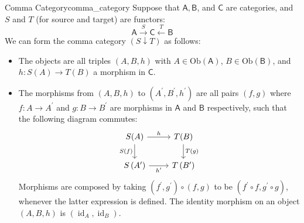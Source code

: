 \begin{definition}{Comma Category}{comma_category}
    Suppose that $\mathsf{A}, \mathsf{B}$, and $\mathsf{C}$ are categories, and $S$ and $T$ (for source and target) are functors:
$$
\mathsf{A} \stackrel{S}{\longrightarrow} \mathsf{C} \stackrel{T}{\longleftarrow} \mathsf{B}
$$
We can form the comma category $(S\downarrow T)$ as follows:
\begin{itemize}
    \item The objects are all triples $(A, B, h)$ with $A\in\mathrm{Ob}(\mathsf{A})$, $B\in\mathrm{Ob}(\mathsf{B})$, and $h: S(A) \rightarrow T(B)$ a morphism in $\mathsf{C}$.
    \item The morphisms from $(A, B, h)$ to $\left(A^{\prime}, B^{\prime}, h^{\prime}\right)$ are all pairs $(f, g)$ where $f: A \rightarrow A^{\prime}$ and $g: B \rightarrow B^{\prime}$ are morphisms in $\mathsf{A}$ and $\mathsf{B}$ respectively, such that the following diagram commutes:
    \[
        \begin{tikzcd}[ampersand replacement=\&]
            S(A) \arrow[r, "h"] \arrow[d, "S(f)"'] \& T(B) \arrow[d, "T(g)"] \\
            S\left(A^{\prime}\right) \arrow[r, "h^{\prime}"'] \& T\left(B^{\prime}\right)
            \end{tikzcd}
    \]
    Morphisms are composed by taking $\left(f^{\prime}, g^{\prime}\right) \circ(f, g)$ to be $\left(f^{\prime} \circ f, g^{\prime} \circ g\right)$, whenever the latter expression is defined. The identity morphism on an object $(A, B, h)$ is $\left(\operatorname{id}_A, \operatorname{id}_B\right)$.
\end{itemize}
\end{definition}

